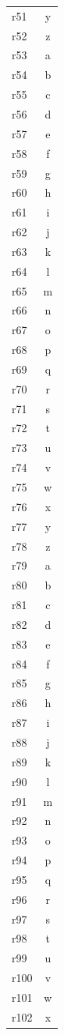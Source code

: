 \documentclass[12pt]{article}
\begin{document}
\begin{longtable}{lc}
r51 & y\\
r52 & z\\
r53 & a\\
r54 & b\\
r55 & c\\
r56 & d\\
r57 & e\\
r58 & f\\
r59 & g\\
r60 & h\\
r61 & i\\
r62 & j\\
r63 & k\\
r64 & l\\
r65 & m\\
r66 & n\\
r67 & o\\
r68 & p\\
r69 & q\\
r70 & r\\
r71 & s\\
r72 & t\\
r73 & u\\
r74 & v\\
r75 & w\\
r76 & x\\
r77 & y\\
r78 & z\\
r79 & a\\
r80 & b\\
r81 & c\\
r82 & d\\
r83 & e\\
r84 & f\\
r85 & g\\
r86 & h\\
r87 & i\\
r88 & j\\
r89 & k\\
r90 & l\\
r91 & m\\
r92 & n\\
r93 & o\\
r94 & p\\
r95 & q\\
r96 & r\\
r97 & s\\
r98 & t\\
r99 & u\\
r100 & v\\
r101 & w\\
r102 & x\\

\end{longtable}
\end{document}
